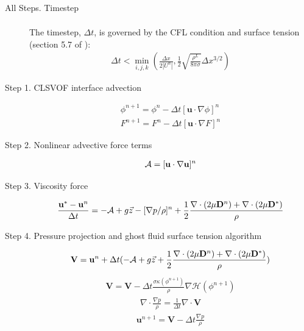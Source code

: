 \documentclass{elsarticle}
\newcommand{\Hea}{\mathcal{H}}
\newcommand{\vv}{\mathbf}
\newcommand{\bmV}{\vv{V}}
\newcommand{\bmD}{\vv{D}}
\newcommand{\bmu}{\vv{u}}
\begin{document}
\begin{description}
\item[All Steps. Timestep] 
 \begin{eqnarray*}
 \end{eqnarray*}
  The timestep, $\Delta t$, is governed by the CFL condition and
  surface tension (section 5.7 of \citet{SusSmiHusOhtZhi07}):
 \begin{eqnarray*}
 \Delta t < \min_{i,j,k} \left( \frac{\Delta x}{2|U^{n}|},
   \frac{1}{2}\sqrt{\frac{\rho^{L}}{8\pi\sigma}}\Delta x^{3/2}\right)
 \end{eqnarray*}
  
\item[Step 1. CLSVOF interface advection]
 \begin{eqnarray*}
 \phi^{n+1}=\phi^{n}-\Delta t[\bmu\cdot\nabla\phi]^{n} \\
 F^{n+1}=F^{n}-\Delta t[\bmu\cdot\nabla F]^{n} 
 \end{eqnarray*}
\item[Step 2. Nonlinear advective force terms]
 \begin{eqnarray*}
 {\cal A}=[\bmu\cdot\nabla\bmu]^{n}
 \end{eqnarray*}
\item[Step 3. Viscosity force]
 \begin{eqnarray*}
 \frac{\bmu^{\ast}-\bmu^{n}}{\Delta t}=-{\cal A}+g\vec{z}-
  [\nabla p/\rho]^{n}+\frac{1}{2}\frac{
    \nabla\cdot(2\mu\bmD^{n})+ 
    \nabla\cdot(2\mu\bmD^{\ast})}{\rho}
 \end{eqnarray*}
\item[Step 4. Pressure projection and ghost fluid surface tension algorithm]
 \begin{eqnarray*}
 \bmV=\bmu^{n}+\Delta t(-{\cal A}+g\vec{z}+
   \frac{1}{2}\frac{
    \nabla\cdot(2\mu\bmD^{n})+ 
    \nabla\cdot(2\mu\bmD^{\ast})}{\rho})
 \end{eqnarray*}
 \begin{eqnarray*}
 \bmV=\bmV-
   \Delta t \frac{\sigma\kappa(\phi^{n+1})}{\rho}\nabla \Hea(\phi^{n+1}) 
 \end{eqnarray*}
 \begin{eqnarray*}
 \nabla\cdot\frac{\nabla p}{\rho}=\frac{1}{\Delta t}\nabla\cdot\bmV
 \end{eqnarray*}
 \begin{eqnarray*}
 \bmu^{n+1}=\bmV-\Delta t \frac{\nabla p}{\rho}
 \end{eqnarray*}
\end{description}
\end{document}
